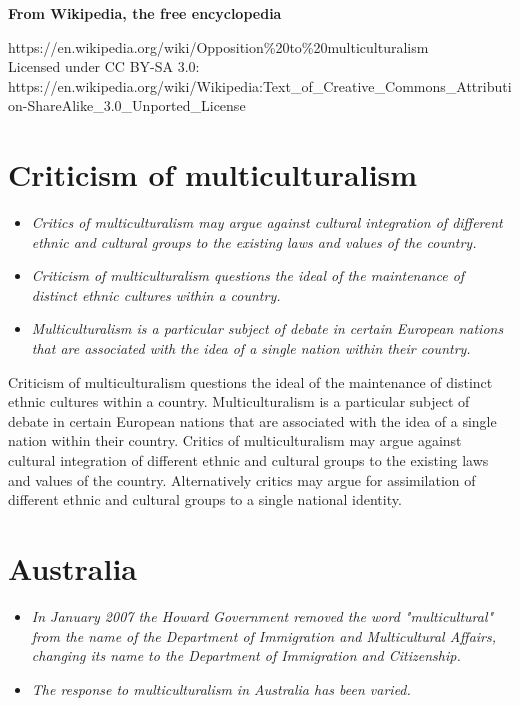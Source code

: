 \textbf{From Wikipedia, the free encyclopedia}

https://en.wikipedia.org/wiki/Opposition\%20to\%20multiculturalism\\
Licensed under CC BY-SA 3.0:\\
https://en.wikipedia.org/wiki/Wikipedia:Text\_of\_Creative\_Commons\_Attribution-ShareAlike\_3.0\_Unported\_License

\section{Criticism of
multiculturalism}\label{criticism-of-multiculturalism}

\begin{itemize}
\item
  \emph{Critics of multiculturalism may argue against cultural
  integration of different ethnic and cultural groups to the existing
  laws and values of the country.}
\item
  \emph{Criticism of multiculturalism questions the ideal of the
  maintenance of distinct ethnic cultures within a country.}
\item
  \emph{Multiculturalism is a particular subject of debate in certain
  European nations that are associated with the idea of a single nation
  within their country.}
\end{itemize}

Criticism of multiculturalism questions the ideal of the maintenance of
distinct ethnic cultures within a country. Multiculturalism is a
particular subject of debate in certain European nations that are
associated with the idea of a single nation within their country.
Critics of multiculturalism may argue against cultural integration of
different ethnic and cultural groups to the existing laws and values of
the country. Alternatively critics may argue for assimilation of
different ethnic and cultural groups to a single national identity.

\section{Australia}\label{australia}

\begin{itemize}
\item
  \emph{In January 2007 the Howard Government removed the word
  "multicultural" from the name of the Department of Immigration and
  Multicultural Affairs, changing its name to the Department of
  Immigration and Citizenship.}
\item
  \emph{The response to multiculturalism in Australia has been varied.}
\end{itemize}

